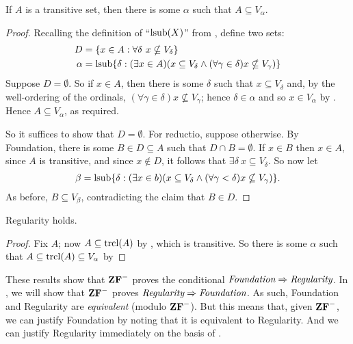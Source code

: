 \documentclass[../../../include/open-logic-section]{subfiles}
\begin{document}
\begin{lem}
If $A$ is a transitive set, then there is some $\alpha$ such that $A
\subseteq V_\alpha$.
\end{lem}

\begin{proof}
Recalling the definition of ``$\operatorname*{\mathrm{lsub}}(X)$'' from
, define two sets:
\begin{align*}
	D  &= \{ x \in A : \forall \delta\ x \nsubseteq V_\delta \}\\
	\alpha &= \operatorname*{\mathrm{lsub}}\{ \delta : (\exists x \in A)
	(x \subseteq V_\delta \land (\forall \gamma \in \delta)x \nsubseteq V_\gamma) \}
\end{align*}
Suppose $D = \emptyset$. So if $x \in A$, then there is some $\delta$ such that $x \subseteq V_\delta$ and, by the well-ordering of the ordinals, $(\forall \gamma \in \delta)x \nsubseteq V_\gamma$; hence $\delta \in \alpha$ and so $x \in V_\alpha$ by
. Hence $A \subseteq
V_{\alpha}$, as required. 

So it suffices to show that $D = \emptyset$. For reductio, suppose
otherwise. By Foundation, there is some $B \in D \subseteq A$ such that $D \cap B
= \emptyset$. If $x \in B$ then $x \in A$, since $A$ is transitive,
and since $x \notin D$, it follows that $\exists \delta\ x \subseteq
V_\delta$. So now let
\[
	\beta = \operatorname*{\mathrm{lsub}}\{ \delta : (\exists x \in b)(x \subseteq V_\delta \land (\forall \gamma < \delta)x \nsubseteq V_\gamma) \}.
\]
As before, $B \subseteq V_\beta$, contradicting the claim that $B \in
D$.	
\end{proof}

\begin{thm}
Regularity holds.
\end{thm}

\begin{proof}
Fix $A$; now $A \subseteq \mathrm{trcl}(A)$ by , which is transitive. So there is some $\alpha$ such that $A \subseteq \mathrm{trcl}(A) \subseteq V_\alpha$ by 
\end{proof}

These results show that $\mathbf{ZF}^{-}$ proves the conditional
$\emph{Foundation}\Rightarrow\emph{Regularity}$. In
, we will show that
$\mathbf{ZF}^{-}$ proves $\emph{Regularity}\Rightarrow\emph{Foundation}$. As
such, Foundation and Regularity are \emph{equivalent} (modulo
$\mathbf{ZF}^{-}$). But this means that, given $\mathbf{ZF}^{-}$, we can justify
Foundation by noting that it is equivalent to Regularity. And we can
justify Regularity immediately on the basis of \stageshier{}. 
\end{document}
